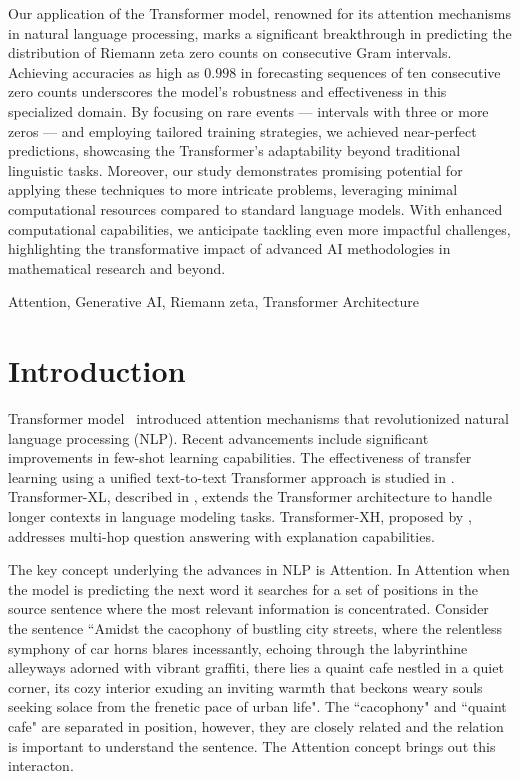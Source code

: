 \documentclass[journal]{IEEEtai}
\begin{document}
\begin{IEEEImpStatement}
Our application of the Transformer model, renowned for its attention mechanisms in natural language processing, marks a significant breakthrough in predicting the distribution of Riemann zeta zero counts on consecutive Gram intervals. Achieving accuracies as high as $0.998$ in forecasting sequences of ten consecutive zero counts underscores the model's robustness and effectiveness in this specialized domain. By focusing on rare events — intervals with three or more zeros — and employing tailored training strategies, we achieved near-perfect predictions, showcasing the Transformer's adaptability beyond traditional linguistic tasks. Moreover, our study demonstrates promising potential for applying these techniques to more intricate problems, leveraging minimal computational resources compared to standard language models. With enhanced computational capabilities, we anticipate tackling even more impactful challenges, highlighting the transformative impact of advanced AI methodologies in mathematical research and beyond.

\end{IEEEImpStatement}

\begin{IEEEkeywords}
Attention, Generative AI, Riemann zeta, Transformer Architecture
\end{IEEEkeywords}



\section{Introduction}

  Transformer model~\cite{vaswani2017attention} introduced attention mechanisms that revolutionized natural language processing (NLP).
Recent advancements \cite{radford2019language,brown2020language} include significant improvements in few-shot learning capabilities.
The effectiveness of transfer learning using a unified text-to-text Transformer approach is studied in \cite{raffel2019exploring}.
Transformer-XL, described in \cite{dai2019transformerxl}, extends the Transformer architecture to handle longer contexts in language modeling tasks.
Transformer-XH, proposed by \cite{zhang2019transformerxh}, addresses multi-hop question answering with explanation capabilities. 

The key concept underlying the advances in NLP is Attention. In Attention when the model is predicting the next word it searches for a set of positions in the source sentence where the most relevant information is concentrated. 
Consider the sentence ``Amidst the cacophony of bustling city streets, where the relentless symphony of car horns blares incessantly, echoing through the labyrinthine alleyways adorned with vibrant graffiti, there lies a quaint cafe nestled in a quiet corner, its cozy interior exuding an inviting warmth that beckons weary souls seeking solace from the frenetic pace of urban life". The ``cacophony" and ``quaint cafe" are separated in position, however, they are closely related and the relation is important to understand the sentence. The Attention concept brings out this interacton.
\end{document}
